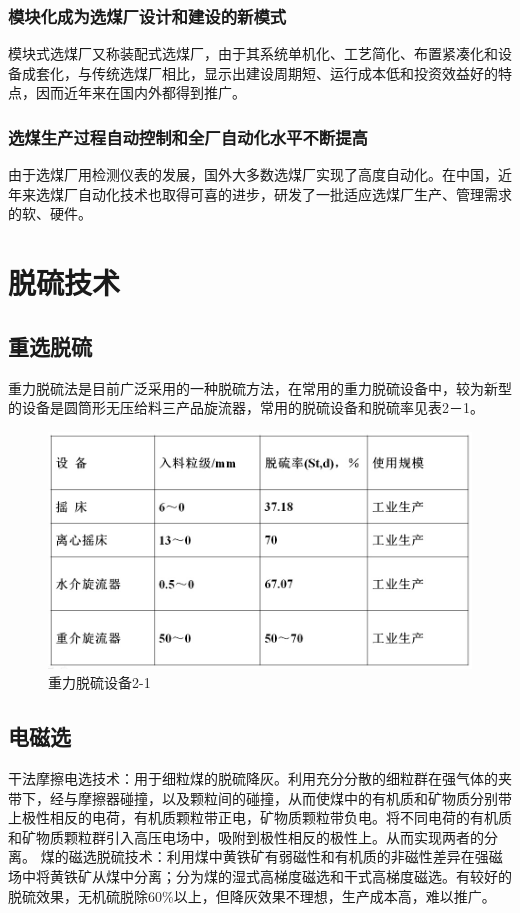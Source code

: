 \documentclass[10pt,openany]{ctexbook}
\begin{document}
\subsubsection{模块化成为选煤厂设计和建设的新模式}
模块式选煤厂又称装配式选煤厂，由于其系统单机化、工艺简化、布置紧凑化和设备成套化，与传统选煤厂相比，显示出建设周期短、运行成本低和投资效益好的特点，因而近年来在国内外都得到推广。
\subsubsection{选煤生产过程自动控制和全厂自动化水平不断提高}
 由于选煤厂用检测仪表的发展，国外大多数选煤厂实现了高度自动化。在中国，近年来选煤厂自动化技术也取得可喜的进步，研发了一批适应选煤厂生产、管理需求的软、硬件。
 \section{脱硫技术}
 \subsection{重选脱硫}
     重力脱硫法是目前广泛采用的一种脱硫方法，在常用的重力脱硫设备中，较为新型的设备是圆筒形无压给料三产品旋流器，常用的脱硫设备和脱硫率见表2－1。
   \begin{figure}[!ht]
\includegraphics[scale=0.646]{24}
\caption{重力脱硫设备2-1}
\end{figure}
 \subsection{电磁选}
干法摩擦电选技术：用于细粒煤的脱硫降灰。利用充分分散的细粒群在强气体的夹带下，经与摩擦器碰撞，以及颗粒间的碰撞，从而使煤中的有机质和矿物质分别带上极性相反的电荷，有机质颗粒带正电，矿物质颗粒带负电。将不同电荷的有机质和矿物质颗粒群引入高压电场中，吸附到极性相反的极性上。从而实现两者的分离。
煤的磁选脱硫技术：利用煤中黄铁矿有弱磁性和有机质的非磁性差异在强磁场中将黄铁矿从煤中分离；分为煤的湿式高梯度磁选和干式高梯度磁选。有较好的脱硫效果，无机硫脱除60\%以上，但降灰效果不理想，生产成本高，难以推广。
\end{document}
